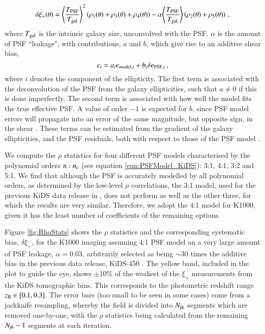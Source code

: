 \documentclass{aa}
\begin{document}
	\begin{equation}
\delta \xi_+(\theta) = { \Bigg\langle \frac{T_{\rm PSF }}{T_{\rm gal}} \Bigg\rangle}^2 \left(\rho_1(\theta) + \rho_3(\theta) + \rho_4(\theta) \right) - \alpha \Bigg\langle \frac{T_{\rm PSF}}{T_{\rm gal}} \Bigg\rangle \left( \rho_2(\theta) + \rho_5(\theta) \right) \,,
	\label{eqn:RhoStats_Bias}
\end{equation}
	where $T_{\rm gal}$ is the intrinsic galaxy size, unconvolved with the PSF. $\alpha$ is the amount of PSF ``leakage", with contributions, $a$ and $b$, which give rise to an additive shear bias,
	\begin{equation}
	c_i = a_i e_{{\rm model},i} + b_i \delta e_{{\rm PSF},i} \,,
	\end{equation}
		where $i$ denotes the component of the ellipticity. The first term is associated with the deconvolution of the PSF from the galaxy ellipticities, such that $a \neq 0$ if this is done imperfectly. The second term is associated with how well the model fits the true effective PSF. A value of order $-1$ is expected for $b$, since PSF model errors will propagate into an error of the same magnitude, but opposite sign, in the shear \citep{Paulin-Henriksson_etal_2008}. These terms can be estimated from the gradient of the galaxy ellipticities, and the PSF residuals, both with respect to those of the PSF model \citep{Zuntz_etal_2018}. 
		
	We compute the $\rho$ statistics for four different PSF models characterised by the polynomial orders $n:n_{\rm c}$ (see equation \ref{eqn:PSFModel_KiDS}): 3:1, 4:1, 3:2 and 5:1. We find that although the PSF is accurately modelled by all polynomial orders, as determined by the low-level $\rho$ correlations, the 3:1 model, used for the previous KiDS data release in \cite{Kuijken_etal_2015}, does not perform as well as the other three, for which the results are very similar. Therefore, we adopt the 4:1 model for K1000, given it has the least number of coefficients of the remaining options.
	

	Figure \ref{fig:RhoStats} shows the $\rho$ statistics and the corresponding systematic bias, $\delta\xi_+$, for the K1000 imaging assuming 4:1 PSF model an a very large amount of PSF leakage, $\alpha=0.03$, arbitrarily selected as being $\sim 30$ times the additive bias in the previous data release, KiDS-450 \citep{Hildebrandt_etal_2016}. The yellow band, included in the plot to guide the eye, shows $\pm$10\% of the weakest of the $\xi_+$ measurements from the KiDS tomographic bins. This corresponds to the photometric redshift range $z_{\rm B} \in [0.1,0.3]$. The error bars (too small to be seen in some cases) come from a jackknife resampling, whereby the field is divided into $N_{\rm jk}$ segments which are removed one-by-one, with the $\rho$ statistics being calculated from the remaining $N_{\rm jk}-1$ segments at each iteration.
\end{document}
